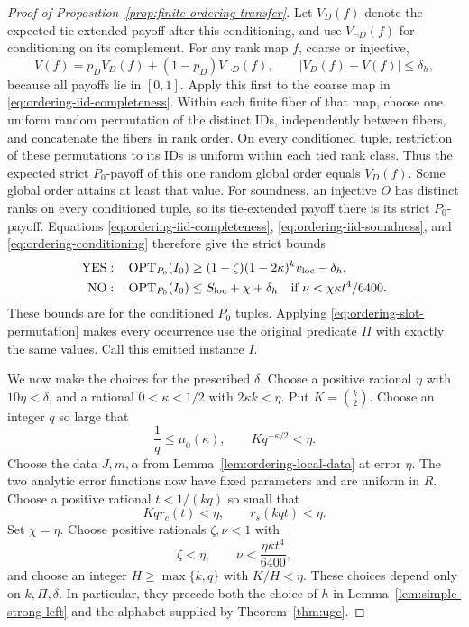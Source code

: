 \begin{proof}[Proof of Proposition~\ref{prop:finite-ordering-transfer}]
Let \(V_D(f)\) denote the expected tie-extended payoff after this
conditioning, and use \(V_{\neg D}(f)\) for conditioning on its
complement.  For any rank map \(f\), coarse or injective,
\begin{equation}
 V(f)=p_DV_D(f)+(1-p_D)V_{\neg D}(f),
 \qquad |V_D(f)-V(f)|\le\delta_h,
\label{eq:ordering-conditioning}
\end{equation}
because all payoffs lie in \([0,1]\).  Apply this first to the coarse
map in \eqref{eq:ordering-iid-completeness}.  Within each finite fiber
of that map, choose one uniform random permutation of the distinct
IDs, independently between fibers, and concatenate the fibers in
rank order.  On every conditioned tuple, restriction of these
permutations to its IDs is uniform within each tied rank class.
Thus the expected strict \(P_0\)-payoff of this one random global
order equals \(V_D(f)\).  Some global order attains at least that
value.  For soundness, an injective \(O\) has distinct ranks on every
conditioned tuple, so its tie-extended payoff there is its strict
\(P_0\)-payoff.  Equations \eqref{eq:ordering-iid-completeness},
\eqref{eq:ordering-iid-soundness}, and \eqref{eq:ordering-conditioning}
therefore give the strict bounds
\begin{equation}
\begin{aligned}
 \mathrm{YES}:\quad&
 \operatorname{OPT}_{P_0}(I_0)\ge(1-\zeta)(1-2\kappa)^k v_{\mathrm{loc}}-\delta_h,\\
 \mathrm{NO}:\quad&
 \operatorname{OPT}_{P_0}(I_0)\le S_{\mathrm{loc}}+\chi+\delta_h
 \quad\text{if }\nu<\chi\kappa t^4/6400.
\end{aligned}
\label{eq:ordering-conditioned-gap}
\end{equation}
These bounds are for the conditioned \(P_0\) tuples.  Applying
\eqref{eq:ordering-slot-permutation} makes every occurrence use the
original predicate \(\Pi\) with exactly the same values.  Call this
emitted instance \(I\).

We now make the choices for the prescribed \(\delta\).  Choose a
positive rational \(\eta\) with \(10\eta<\delta\), and a rational
\(0<\kappa<1/2\) with \(2\kappa k<\eta\).  Put \(K=\binom{k}{2}\).
Choose an integer \(q\) so large that
\[
 \frac1q\le\mu_0(\kappa),\qquad Kq^{-\kappa/2}<\eta.
\]
Choose the data \(J,m,\alpha\) from
Lemma~\ref{lem:ordering-local-data} at error \(\eta\).  The two
analytic error functions now have fixed parameters and are uniform
in \(R\).  Choose a positive rational \(t<1/(kq)\) so small that
\[
 Kq r_c(t)<\eta,\qquad r_s(kqt)<\eta.
\]
Set \(\chi=\eta\).  Choose positive rationals \(\zeta,\nu<1\) with
\[
 \zeta<\eta,\qquad
 \nu<\frac{\eta\kappa t^4}{6400},
\]
and choose an integer \(H\ge\max\{k,q\}\) with \(K/H<\eta\).
These choices depend only on \(k,\Pi,\delta\).  In particular, they
precede both the choice of \(h\) in
Lemma~\ref{lem:simple-strong-left} and the alphabet supplied by
Theorem~\ref{thm:ugc}.


\end{proof}
